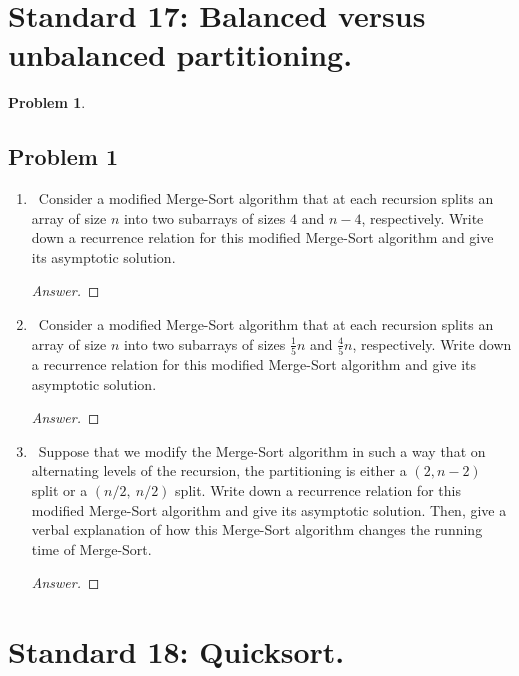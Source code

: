\documentclass[11pt]{article}
\theoremstyle{definition}
\theoremstyle{definition}
\newtheorem{required}{Problem}
\theoremstyle{definition}
\begin{document}
\newpage
\section{Standard 17: Balanced versus unbalanced partitioning.}

\begin{required}
\subsection{Problem 1}
\begin{enumerate}[label=(\alph*)]
\item \label{(a).}~Consider a modified Merge-Sort algorithm that at each recursion splits an array of size $n$  into two subarrays of sizes $4$ and $n-4$, respectively. Write down a recurrence relation for this modified Merge-Sort algorithm and give its asymptotic solution.

\begin{proof}[Answer]
\end{proof}

\newpage

\item \label{(b)}~Consider a modified Merge-Sort algorithm that at each recursion splits an array of size $n$  into two subarrays of sizes $\frac{1}{5}n$ and $\frac{4}{5}n$, respectively. Write down a recurrence relation for this modified Merge-Sort algorithm and give its asymptotic solution.


\begin{proof}[Answer]
\end{proof}


\newpage

\item \label{(c)}~Suppose that we modify the Merge-Sort algorithm in such a way that on alternating levels of the recursion, the partitioning is either a $(2, n-2)$ split or a $(n/2,~n/2)$ split. Write down a recurrence relation for this modified Merge-Sort algorithm and give its asymptotic solution. Then, give a verbal explanation of how this Merge-Sort algorithm changes the running time of Merge-Sort.


\begin{proof}[Answer]
\end{proof}

\end{enumerate}
\end{required}


\newpage
\section{Standard 18: Quicksort.}
\end{document}
